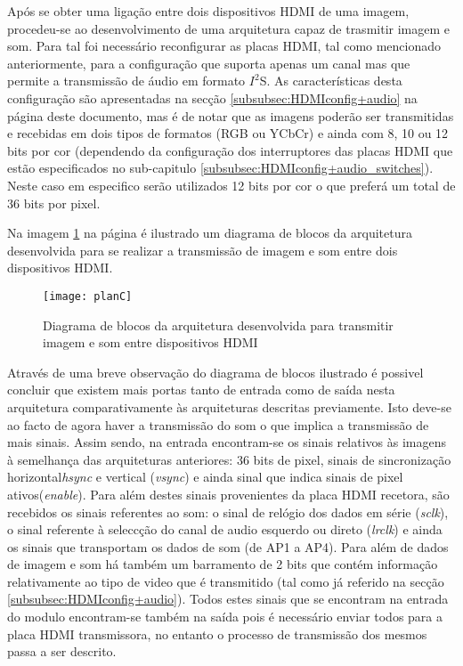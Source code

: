 Após se obter uma ligação entre dois dispositivos HDMI de uma imagem, procedeu-se ao desenvolvimento de uma arquitetura capaz de trasmitir imagem e som. Para tal foi necessário reconfigurar as placas HDMI, tal como mencionado anteriormente, para a configuração que suporta apenas um canal mas que permite a transmissão de áudio em formato $I^{2}$S. As características desta configuração são apresentadas na secção \ref{subsubsec:HDMIconfig+audio} na página \pageref{subsubsec:HDMIconfig+audio} deste documento, mas é de notar que as imagens poderão ser transmitidas e recebidas em dois tipos de formatos (RGB ou YCbCr) e ainda com 8, 10 ou 12 bits por cor (dependendo da configuração dos interruptores das placas HDMI que estão especificados no sub-capitulo \ref{subsubsec:HDMIconfig+audio_switches}). Neste caso em especifico serão utilizados 12 bits por cor o que preferá um total de 36 bits por pixel.

Na imagem \ref{fig:planC} na página \pageref{fig:planC} é ilustrado um diagrama de blocos da arquitetura desenvolvida para se realizar a transmissão de imagem e som entre dois dispositivos HDMI. 

\begin{figure}[h!]
	\begin{center}
		\leavevmode
		\texttt{[image: planC]}
		\caption{Diagrama de blocos da arquitetura desenvolvida para transmitir imagem e som entre dispositivos HDMI}
		\label{fig:planC}
	\end{center}
\end{figure}

Através de uma breve observação do diagrama de blocos ilustrado é possivel concluir que existem mais portas tanto de entrada como de saída nesta arquitetura comparativamente às arquiteturas descritas previamente. Isto deve-se ao facto de agora haver a transmissão do som o que implica a transmissão de mais sinais. Assim sendo, na entrada encontram-se os sinais relativos às imagens à semelhança das arquiteturas anteriores: 36 bits de pixel, sinais de sincronização horizontal\textit{hsync} e vertical (\textit{vsync}) e ainda sinal que indica sinais de pixel ativos(\textit{enable}). Para além destes sinais provenientes da placa HDMI recetora, são recebidos os sinais referentes ao som: o sinal de relógio dos dados em série (\textit{sclk}), o sinal referente à seleccção do canal de audio esquerdo ou direto (\textit{lrclk}) e ainda os sinais que transportam os dados de som (de AP1 a AP4). Para além de dados de imagem e som há também um barramento de 2 bits que contém informação relativamente ao tipo de video que é transmitido (tal como já referido na secção \ref{subsubsec:HDMIconfig+audio}). Todos estes sinais que se encontram na entrada do modulo encontram-se também na saída pois é necessário enviar todos para a placa HDMI transmissora, no entanto o processo de transmissão dos mesmos passa a ser descrito.


